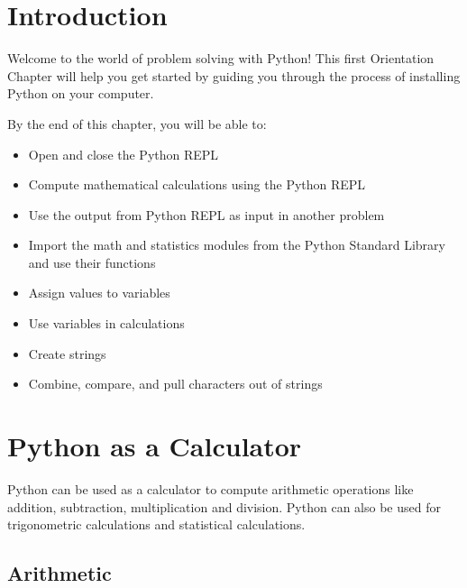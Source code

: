 \documentclass{book}
\begin{document}
    
        \section{Introduction}\label{introduction}
    




    
        Welcome to the world of problem solving with Python! This first
Orientation Chapter will help you get started by guiding you through the
process of installing Python on your computer.
    




    
        By the end of this chapter, you will be able to:

\begin{itemize}
\item
  Open and close the Python REPL
\item
  Compute mathematical calculations using the Python REPL
\item
  Use the output from Python REPL as input in another problem
\item
  Import the math and statistics modules from the Python Standard
  Library and use their functions
\item
  Assign values to variables
\item
  Use variables in calculations
\item
  Create strings
\item
  Combine, compare, and pull characters out of strings
\end{itemize}
        \newpage



    




    
        \section{Python as a Calculator}\label{python-as-a-calculator}
    




    
        Python can be used as a calculator to compute arithmetic operations like
addition, subtraction, multiplication and division. Python can also be
used for trigonometric calculations and statistical calculations.
    




    
        \subsection{Arithmetic}\label{arithmetic}
\end{document}

